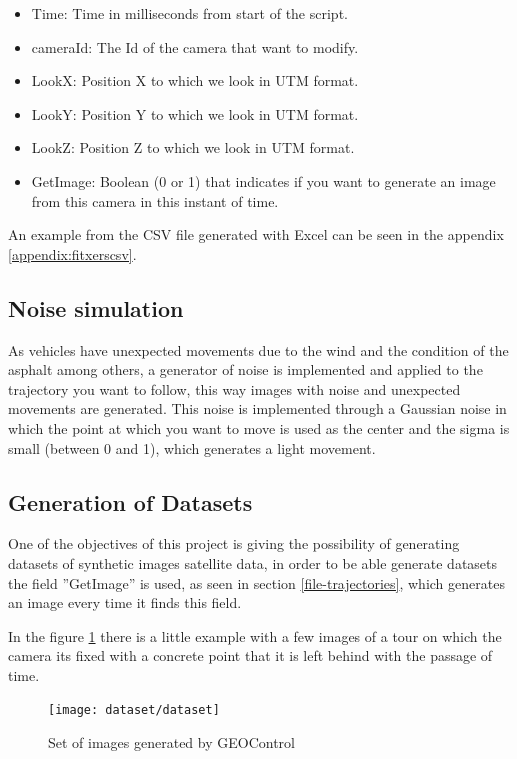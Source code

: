 \documentclass[10pt,a4paper,twocolumn,twoside]{article}
\begin{document}
\begin{itemize}
\item Time: Time in milliseconds from start of the script.
\item cameraId: The Id of the camera that want to modify.
\item LookX: Position X to which we look in UTM format.
\item LookY: Position Y to which we look in UTM format.
\item LookZ: Position Z to which we look in UTM format.
\item GetImage: Boolean (0 or 1) that indicates if you want to generate an image from this camera in this instant of time.
\end{itemize}

An example from the CSV file generated with Excel can be seen in the appendix \ref{appendix:fitxerscsv}.

\subsection{Noise simulation}

As vehicles have unexpected movements due to the wind and the condition of the asphalt among others, a generator of noise is implemented and applied to the trajectory you want to follow, this way images with noise and unexpected movements are generated. This noise is implemented through a Gaussian noise in which the point at which you want to move is used as the center and the sigma is small (between 0 and 1), which generates a light movement.

\subsection{Generation of Datasets}
One of the objectives of this project is giving the possibility of generating datasets of synthetic images satellite data, in order to be able generate datasets the field ''GetImage'' is used, as seen in section \ref{file-trajectories}, which generates an image every time it finds this field.

In the figure \ref{fig-dataset} there is a little example with a few images of a tour on which the camera its fixed with a concrete point that it is left behind with the passage of time.

\begin{figure}[!h]
\centering
  	\texttt{[image: dataset/dataset]}
	\caption{Set of images generated by GEOControl}
	\label{fig-dataset}
\end{figure}
\end{document}
